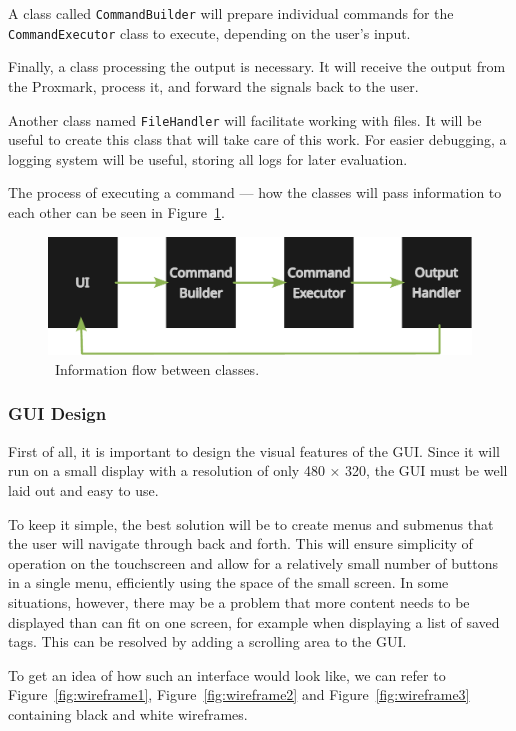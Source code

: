 A class called \texttt{CommandBuilder} will prepare individual commands for the \texttt{CommandExecutor} class to execute, depending on the user's input.

Finally, a class processing the output is necessary. It will receive the output from the Proxmark, process it, and forward the signals back to the user.

Another class named \texttt{FileHandler} will facilitate working with files. It will be useful to create this class that will take care of this work. For easier debugging, a logging system will be useful, storing all logs for later evaluation.

The process of executing a command --- how the classes will pass information to each other can be seen in Figure~\ref{fig:architecture}.

\begin{figure}[ht]
  \centering
  \includegraphics[width=\textwidth]{text/design/architecture.pdf}
  \caption{~Information flow between classes.}
  \label{fig:architecture}
\end{figure}


\subsubsection{GUI Design}

First of all, it is important to design the visual features of the GUI. Since it will run on a small display with a resolution of only 480 × 320, the GUI must be well laid out and easy to use.

To keep it simple, the best solution will be to create menus and submenus that the user will navigate through back and forth. This will ensure simplicity of operation on the touchscreen and allow for a relatively small number of buttons in a single menu, efficiently using the space of the small screen. In some situations, however, there may be a problem that more content needs to be displayed than can fit on one screen, for example when displaying a list of saved tags. This can be resolved by adding a scrolling area to the GUI.

To get an idea of how such an interface would look like, we can refer to Figure~\ref{fig:wireframe1}, Figure~\ref{fig:wireframe2} and Figure~\ref{fig:wireframe3} containing black and white wireframes.


